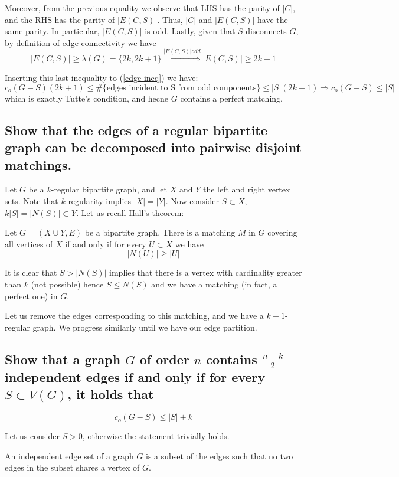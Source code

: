 Moreover, from the previous equality we observe that LHS has the parity of $|C|$, and the RHS has the parity of $|E(C,S)|$. Thus, $|C|$ and $|E(C,S)|$ have the same parity. In particular, $|E(C,S)|$ is odd. Lastly, given that $S$ disconnects $G$, by definition of edge connectivity we have
$$|E(C,S)| \geq \lambda(G) = \lbrace 2k, 2k + 1 \rbrace \overset{|E(C,S)| odd}{\Longrightarrow} |E(C,S)| \geq 2k + 1$$

Inserting this last inequality to (\ref{edge-ineq}) we have:
$$c_o(G-S)(2k + 1) \leq \#\lbrace\text{edges incident to S from odd components}\rbrace \leq |S|(2k + 1) \Rightarrow c_o(G-S) \leq |S|$$
which is exactly Tutte's condition, and hecne $G$ contains a perfect matching.

\subsection[Matchings 3]{Show that the edges of a regular bipartite graph can be decomposed into pairwise disjoint matchings.}

Let $G$ be a $k$-regular bipartite graph, and let $X$ and $Y$ the left and right vertex sets.
Note that $k$-regularity implies $|X| = |Y|$.
Now consider $S \subset X$, $k|S| = |N(S)| \subset Y$.
Let us recall Hall's theorem:
\begin{theorem}[Hall]
    Let $G = (X \cup Y, E)$ be a bipartite graph.
    There is a matching $M$ in $G$ covering all vertices of $X$ if and only if for every $U \subset X$ we have
    $$ |N(U)| \geq |U| $$
\end{theorem}
It is clear that $S > |N(S)|$ implies that there is a vertex with cardinality greater than $k$ (not possible) hence $S \leq N(S)$ and we have a matching (in fact, a perfect one) in $G$.

Let us remove the edges corresponding to this matching, and we have a $k-1$-regular graph.
We progress similarly until we have our edge partition.

\subsection[Matchings 6]{Show that a graph $G$ of order $n$ contains $\frac{n-k}{2}$ independent edges if and only if for every $S \subset V(G)$, it holds that}
$$c_o(G-S) \leq |S| + k$$

Let us consider $S > 0$, otherwise the statement trivially holds.

\begin{remark}
    An independent edge set of a graph $G$ is a subset of the edges such that no two edges in the subset shares a vertex of $G$.
\end{remark}

